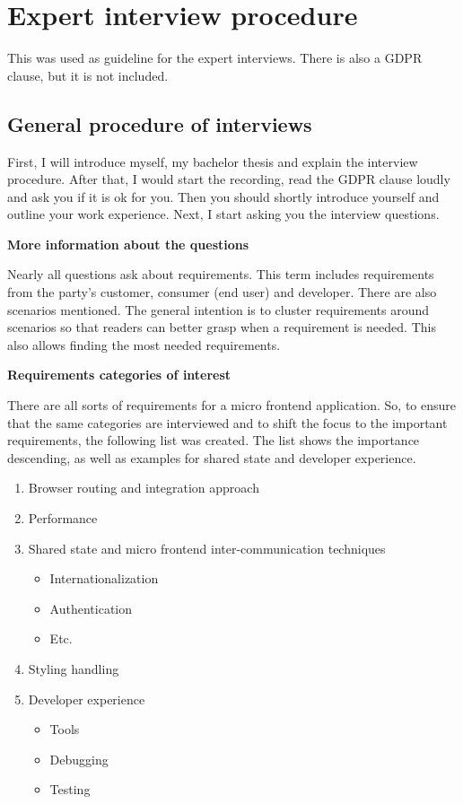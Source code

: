 
\addchap{\langanhang}

\chapter{Expert interview procedure}\label{cha:appendix_expertinterview}

This was used as guideline for the expert interviews.
There is also a \ac{GDPR} clause, but it is not included.

\section{General procedure of interviews}

First, I will introduce myself, my bachelor thesis and explain the interview procedure. After that, I would start the recording, read the \ac{GDPR} clause loudly and ask you if it is ok for you. Then you should shortly introduce yourself and outline your work experience. Next, I start asking you the interview questions.

\textbf{More information about the questions}

Nearly all questions ask about requirements. This term includes requirements from the party’s customer, consumer (end user) and developer. There are also scenarios mentioned. The general intention is to cluster requirements around scenarios so that readers can better grasp when a requirement is needed. This also allows finding the most needed requirements.

\textbf{Requirements categories of interest}

There are all sorts of requirements for a micro frontend application. So, to ensure that the same categories are interviewed and to shift the focus to the important requirements, the following list was created. The list shows the importance descending, as well as examples for shared state and developer experience.

\begin{enumerate}
    \item Browser routing and integration approach
    \item Performance
    \item Shared state and micro frontend inter-communication techniques
          \begin{itemize}
              \item Internationalization
              \item Authentication
              \item Etc.
          \end{itemize}
    \item Styling handling
    \item Developer experience
          \begin{itemize}
              \item Tools
              \item Debugging
              \item Testing
          \end{itemize}
\end{enumerate}

